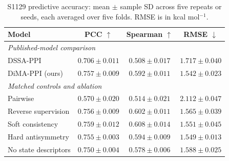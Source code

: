 \begin{table}[t]
\centering
\caption{S1129 predictive accuracy: mean $\pm$ sample SD across five repeats or seeds, each averaged over five folds. RMSE is in kcal mol$^{-1}$.}
\label{tab:accuracy}
\footnotesize
\setlength{\tabcolsep}{3pt}
\begin{tabular}{lccc}
\toprule Model & PCC $\uparrow$ & Spearman $\uparrow$ & RMSE $\downarrow$ \\
\midrule
\multicolumn{4}{l}{\textit{Published-model comparison}} \\
DSSA-PPI~\cite{dssappi} & $0.706\pm0.011$ & $0.508\pm0.017$ & $1.717\pm0.040$ \\
DiMA-PPI (ours) & $0.757\pm0.009$ & $0.592\pm0.011$ & $1.542\pm0.023$ \\
\midrule
\multicolumn{4}{l}{\textit{Matched controls and ablation}} \\
Pairwise & $0.570\pm0.020$ & $0.514\pm0.021$ & $2.112\pm0.047$ \\
Reverse supervision & $0.756\pm0.009$ & $0.602\pm0.011$ & $1.565\pm0.039$ \\
Soft consistency & $0.759\pm0.012$ & $0.608\pm0.014$ & $1.551\pm0.045$ \\
Hard antisymmetry & $0.755\pm0.003$ & $0.594\pm0.009$ & $1.549\pm0.013$ \\
No state descriptors & $0.750\pm0.004$ & $0.578\pm0.006$ & $1.588\pm0.025$ \\
\bottomrule
\end{tabular}
\end{table}
